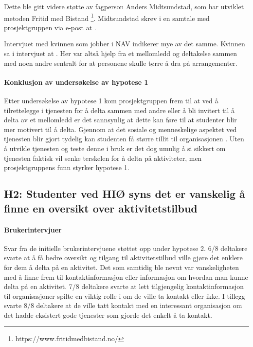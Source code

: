 Dette ble gitt videre støtte av fagperson Anders Midtsundstad, som har utviklet metoden Fritid med Bistand \footnote{https://www.fritidmedbistand.no/}. Midtsundstad skrev i en samtale med prosjektgruppen via e-post at  \cite{MIDTSUNDSTAD-EPOST:14}. 

Intervjuet med kvinnen som jobber i NAV indikerer mye av det samme. Kvinnen sa i intervjuet at  \cite{NAV-INTERVJU:16}. Her var altså hjelp fra et mellomledd og deltakelse sammen med noen andre sentralt for at personene skulle tørre å dra på arrangementer. 

\paragraph{Konklusjon av undersøkelse av hypotese 1}
Etter undersøkelse av hypotese 1 kom prosjektgruppen frem til at ved å tilrettelegge i tjenesten for å delta sammen med andre eller å bli invitert til å delta av et mellomledd er det sannsynlig at dette kan føre til at studenter blir mer motivert til å delta. Gjennom at det sosiale og menneskelige aspektet ved tjenesten blir gjort tydelig kan studenten få større tillit til organisasjonen \cite{MIDTSUNDSTAD-EPOST:14}. Uten å utvikle tjenesten og teste denne i bruk er det dog umulig å si sikkert om tjenesten faktisk vil senke terskelen for å delta på aktiviteter, men prosjektgruppens funn styrker hypotese 1.

\subsection{H2: Studenter ved HIØ syns det er vanskelig å finne en oversikt over aktivitetstilbud}

\paragraph{Brukerintervjuer}
Svar fra de initielle brukerintervjuene støttet opp under hypotese 2. 6/8 deltakere svarte at å få bedre oversikt og tilgang til aktivitetstilbud ville gjøre det enklere for dem å delta på en aktivitet. Det som samtidig ble nevnt var vanskeligheten med å finne frem til kontaktinformasjon eller informasjon om hvordan man kunne delta på en aktivitet. 7/8 deltakere svarte at lett tilgjengelig kontaktinformasjon til organisasjoner spilte en viktig rolle i om de ville ta kontakt eller ikke. I tillegg svarte 8/8 deltakere at de ville tatt kontakt med en interessant organisasjon om det hadde eksistert gode tjenester som gjorde det enkelt å ta kontakt.

